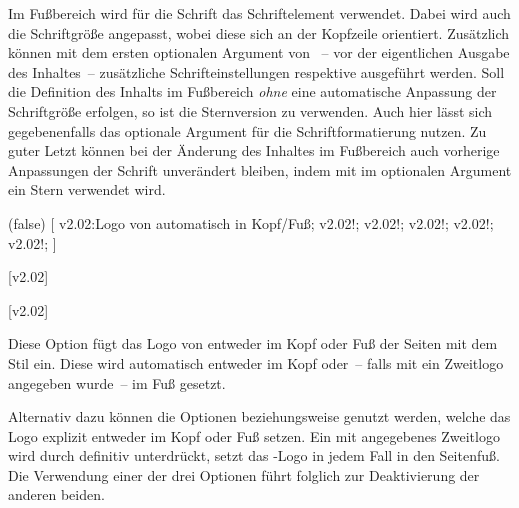 \begin{DeclareEntity*}{}
\begin{DeclareEntity*}{}
\begin{DeclareEntity*}{}
\begin{Declaration}
\begin{Declaration}
%
Im Fußbereich wird für die Schrift das Schriftelement  
verwendet. Dabei wird auch die Schriftgröße angepasst, wobei diese sich an der 
Kopfzeile orientiert. Zusätzlich können mit dem ersten optionalen Argument von 
~-- vor der eigentlichen Ausgabe des Inhaltes~-- zusätzliche 
Schrifteinstellungen respektive  ausgeführt werden. Soll die 
Definition des Inhalts im Fußbereich \emph{ohne} eine automatische Anpassung 
der Schriftgröße erfolgen, so ist die Sternversion  zu 
verwenden. Auch hier lässt sich gegebenenfalls das optionale Argument für die 
Schriftformatierung nutzen.
%
Zu guter Letzt können bei der Änderung des Inhaltes im Fußbereich auch 
vorherige Anpassungen der Schrift unverändert bleiben, indem mit
im optionalen Argument ein Stern verwendet wird. 
\end{Declaration}
\end{Declaration}

\begin{Declaration}
  {}
  (false)
[%
  v2.02:Logo von \DDC automatisch in Kopf/Fuß;%
  v2.02!;
  v2.02!;
  v2.02!;
  v2.02!;
  v2.02!;
]
\begin{Declaration}
  {}
  [v2.02]
\begin{Declaration}
  {}
  [v2.02]

Diese Option fügt das Logo von \DDC entweder im Kopf oder Fuß der Seiten mit 
dem Stil  ein. Diese wird automatisch entweder im Kopf 
oder~-- falls mit  ein Zweitlogo angegeben wurde~-- im Fuß 
gesetzt.

Alternativ dazu können die Optionen  beziehungsweise 
 genutzt werden, welche das Logo explizit entweder im Kopf oder 
Fuß setzen. Ein mit  angegebenes Zweitlogo wird durch 
 definitiv unterdrückt,  setzt das
\DDC-Logo in jedem Fall in den Seitenfuß. Die Verwendung einer der drei 
Optionen führt folglich zur Deaktivierung der anderen beiden.


\end{Declaration}
\end{Declaration}
\end{Declaration}
\end{DeclareEntity*}
\end{DeclareEntity*}
\end{DeclareEntity*}
